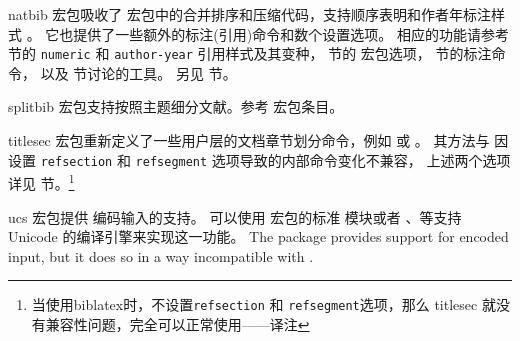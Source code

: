 \begin{marglist}
\item[natbib]
 宏包吸收了 宏包中的合并排序和压缩代码，支持顺序表明和作者年标注样式 。
它也提供了一些额外的标注(引用)命令和数个设置选项。
相应的功能请参考  节的 \texttt{numeric} 和 \texttt{author-year} 引用样式及其变种，
 节的  宏包选项， 节的标注命令，
以及  节讨论的工具。
另见  节。

\item[splitbib]
 宏包支持按照主题细分文献。参考  宏包条目。

\item[titlesec]
 宏包重新定义了一些用户层的文档章节划分命令，例如  或 。
其方法与 \biblatex 因设置 \texttt{refsection} 和 \texttt{refsegment} 选项导致的内部命令变化不兼容，
上述两个选项详见 节。\footnote{当使用biblatex时，不设置\texttt{refsection} 和 \texttt{refsegment}选项，那么 titlesec 就没有兼容性问题，完全可以正常使用——译注}

\item[ucs]
 宏包提供 \utf 编码输入的支持。
可以使用  宏包的标准  模块或者 \XeTeX 、\LuaTeX 等支持 Unicode 的编译引擎来实现这一功能。
The  package provides support for \utf encoded input, but it does so in a way incompatible with \biblatex.


\end{marglist}
